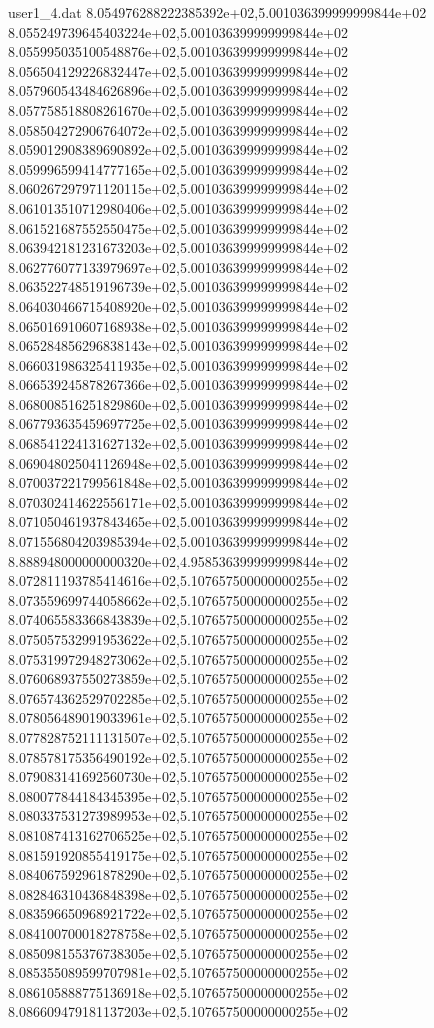 \begin{filecontents}{user1_4.dat}
8.054976288222385392e+02,5.001036399999999844e+02
8.055249739645403224e+02,5.001036399999999844e+02
8.055995035100548876e+02,5.001036399999999844e+02
8.056504129226832447e+02,5.001036399999999844e+02
8.057960543484626896e+02,5.001036399999999844e+02
8.057758518808261670e+02,5.001036399999999844e+02
8.058504272906764072e+02,5.001036399999999844e+02
8.059012908389690892e+02,5.001036399999999844e+02
8.059996599414777165e+02,5.001036399999999844e+02
8.060267297971120115e+02,5.001036399999999844e+02
8.061013510712980406e+02,5.001036399999999844e+02
8.061521687552550475e+02,5.001036399999999844e+02
8.063942181231673203e+02,5.001036399999999844e+02
8.062776077133979697e+02,5.001036399999999844e+02
8.063522748519196739e+02,5.001036399999999844e+02
8.064030466715408920e+02,5.001036399999999844e+02
8.065016910607168938e+02,5.001036399999999844e+02
8.065284856296838143e+02,5.001036399999999844e+02
8.066031986325411935e+02,5.001036399999999844e+02
8.066539245878267366e+02,5.001036399999999844e+02
8.068008516251829860e+02,5.001036399999999844e+02
8.067793635459697725e+02,5.001036399999999844e+02
8.068541224131627132e+02,5.001036399999999844e+02
8.069048025041126948e+02,5.001036399999999844e+02
8.070037221799561848e+02,5.001036399999999844e+02
8.070302414622556171e+02,5.001036399999999844e+02
8.071050461937843465e+02,5.001036399999999844e+02
8.071556804203985394e+02,5.001036399999999844e+02
8.888948000000000320e+02,4.958536399999999844e+02
8.072811193785414616e+02,5.107657500000000255e+02
8.073559699744058662e+02,5.107657500000000255e+02
8.074065583366843839e+02,5.107657500000000255e+02
8.075057532991953622e+02,5.107657500000000255e+02
8.075319972948273062e+02,5.107657500000000255e+02
8.076068937550273859e+02,5.107657500000000255e+02
8.076574362529702285e+02,5.107657500000000255e+02
8.078056489019033961e+02,5.107657500000000255e+02
8.077828752111131507e+02,5.107657500000000255e+02
8.078578175356490192e+02,5.107657500000000255e+02
8.079083141692560730e+02,5.107657500000000255e+02
8.080077844184345395e+02,5.107657500000000255e+02
8.080337531273989953e+02,5.107657500000000255e+02
8.081087413162706525e+02,5.107657500000000255e+02
8.081591920855419175e+02,5.107657500000000255e+02
8.084067592961878290e+02,5.107657500000000255e+02
8.082846310436848398e+02,5.107657500000000255e+02
8.083596650968921722e+02,5.107657500000000255e+02
8.084100700018278758e+02,5.107657500000000255e+02
8.085098155376738305e+02,5.107657500000000255e+02
8.085355089599707981e+02,5.107657500000000255e+02
8.086105888775136918e+02,5.107657500000000255e+02
8.086609479181137203e+02,5.107657500000000255e+02

\end{filecontents}
